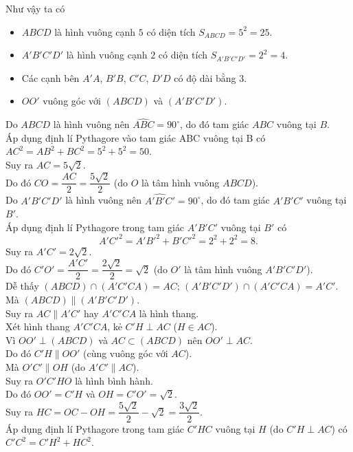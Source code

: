 \begin{ex}
{		Như vậy ta có
		\begin{itemize}
			\item $ABCD$ là hình vuông cạnh $5$ có diện tích $S_{ABCD}=5^2=25$.
			\item $A'B'C'D'$ là hình vuông cạnh $2$ có diện tích $S_{A'B'C'D'}=2^2=4$.
			\item Các cạnh bên $A'A$, $B'B$, $C'C$, $D'D$ có độ dài bằng $3$.
			\item $OO'$ vuông góc với $(ABCD)$ và $(A'B'C'D')$.
		\end{itemize}
		Do $ABCD$ là hình vuông nên $\widehat{ABC}=90^\circ$, do đó tam giác $ABC$ vuông tại $B$.\\
		Áp dụng định lí Pythagore vào tam giác ABC vuông tại B có\\ $AC^2=AB^2+BC^2=5^2+5^2=50$.\\
		Suy ra $AC=5\sqrt 2$.\\
		Do đó $CO=\dfrac{AC}{2}=\dfrac{5\sqrt 2}{2}$ (do $O$ là tâm hình vuông $ABCD$).\\
		Do $A'B'C'D'$ là hình vuông nên $\widehat{A'B'C'}=90^\circ$, do đó tam giác $A'B'C'$ vuông tại $B'$.\\
		Áp dụng định lí Pythagore trong tam giác $A'B'C'$ vuông tại $B'$ có \[A'C'^2=A'B'^2+B'C'^2=2^2+2^2=8.\]
		Suy ra $A'C'=2\sqrt 2$.\\
		Do đó $C'O'=\dfrac{A'C'}{2}=\dfrac{2\sqrt 2}{2}=\sqrt 2$ (do $O'$ là tâm hình vuông $A'B'C'D'$).\\
		Dễ thấy $(ABCD) \cap (A'C'CA)=AC$; $(A'B'C'D') \cap (A'C'CA)=A'C'$.\\
		Mà $(ABCD) \parallel (A'B'C'D')$.\\
		Suy ra $AC \parallel A'C'$ hay $A'C'CA$ là hình thang.\\
		Xét hình thang $A'C'CA$, kẻ $C'H \perp AC$ ($H \in AC$).\\
		Vì $OO' \perp (ABCD)$ và $AC \subset (ABCD)$ nên $OO' \perp AC$.\\
		Do đó $C'H \parallel OO'$ (cùng vuông góc với $AC$).\\
		Mà $O'C' \parallel OH$ (do $A'C' \parallel AC$).\\
		Suy ra $O'C'HO$ là hình bình hành.\\
		Do đó $OO'=C'H$ và $OH=C'O'=\sqrt 2$.\\
		Suy ra $HC=OC-OH=\dfrac{5\sqrt 2}{2}-\sqrt 2=\dfrac{3\sqrt 2}{2}$.\\
		Áp dụng định lí Pythagore trong tam giác $C'HC$ vuông tại $H$ (do $C'H\perp AC$) có $C'C^2=C'H^2+HC^2$.\\		
}
\end{ex}
